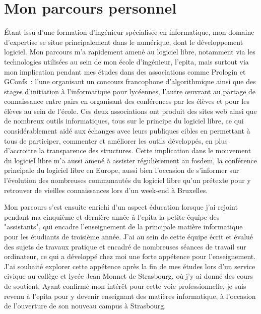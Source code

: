 \section{Mon parcours personnel}

Étant issu d'une formation d'ingénieur spécialisée en informatique, mon domaine d'expertise se situe
principalement dans le numérique, dont le développement logiciel. Mon parcours m'a rapidement amené au
logiciel libre, notamment via les technologies utilisées au sein de mon école d'ingénieur, l'\gls{epita}, mais
surtout via mon implication pendant mes études dans des associations comme
Prologin et GConfs : l'une organisant
un concours francophone d'algorithmique ainsi que des stages d'initiation à l'informatique pour
lycéennes, l'autre œuvrant au partage de connaissance entre pairs en
organisant des conférences par les élèves et pour les élèves au sein de l'école. Ces deux associations ont
produit des sites web ainsi que de nombreux outils informatiques, tous sur le principe du logiciel libre, ce
qui considérablement aidé aux échanges avec leurs publiques cibles en permettant à tous de participer,
commenter et améliorer les outils développés, en plus d'accroitre la transparence des structures. Cette
implication dans le mouvement du logiciel libre m'a aussi amené à assister régulièrement au
\gls{fosdem}, la conférence principale du logiciel libre en Europe, aussi
bien l'occasion de s'informer sur l'évolution des nombreuses communautés du logiciel libre qu'un prétexte pour
y retrouver de vieilles connaissances lors d'un week-end à Bruxelles.

Mon parcours s'est ensuite enrichi d'un aspect éducation lorsque j'ai rejoint pendant ma cinquième et dernière
année à l'\gls{epita} la petite équipe des "assistants", qui encadre l'enseignement de la principale matière
informatique pour les étudiants de troisième année. J'ai au sein de cette équipe écrit et évalué des sujets de
travaux pratique et encadré de nombreuses séances de travail sur ordinateur, ce qui a développé chez moi une
forte appétence pour l'enseignement. J'ai souhaité explorer cette appétence après la fin de mes études lors
d'un service civique au collège et lycée Jean Monnet de Strasbourg, où j'y ai donné des cours de soutient.
Ayant confirmé mon intérêt pour cette voie professionnelle, je suis revenu à l'\gls{epita} pour y devenir
enseignant des matières informatique, à l'occasion de l'ouverture de son nouveau campus à Strasbourg.

